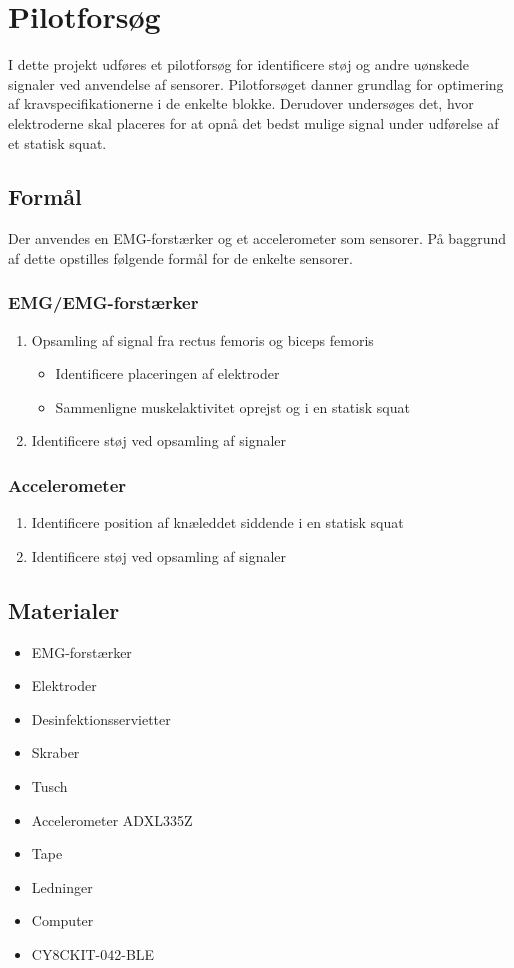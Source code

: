 \section{Pilotforsøg}
I dette projekt udføres et pilotforsøg for identificere støj og andre uønskede signaler ved anvendelse af sensorer. Pilotforsøget danner grundlag for optimering af kravspecifikationerne i de enkelte blokke. Derudover undersøges det, hvor elektroderne skal placeres for at opnå det bedst mulige signal under udførelse af et statisk squat.

\subsection{Formål}
Der anvendes en EMG-forstærker og et accelerometer som sensorer. På baggrund af dette opstilles følgende formål for de enkelte sensorer.  

\subsubsection{EMG/EMG-forstærker}
\begin{enumerate}
\item Opsamling af signal fra rectus femoris og biceps femoris
\begin{itemize}
\item Identificere placeringen af elektroder
\item Sammenligne muskelaktivitet oprejst og i en statisk squat 
\end{itemize}
\item Identificere støj ved opsamling af signaler
\end{enumerate}


\subsubsection{Accelerometer}
\begin{enumerate}
\item Identificere position af knæleddet siddende i en statisk squat
\item Identificere støj ved opsamling af signaler
\end{enumerate}


\subsection{Materialer} 
\begin{itemize}
\item EMG-forstærker
\item Elektroder
\item Desinfektionsservietter
\item Skraber
\item Tusch 

\item Accelerometer ADXL335Z
\item Tape
\item Ledninger

\item Computer
\item CY8CKIT-042-BLE
\end{itemize}

